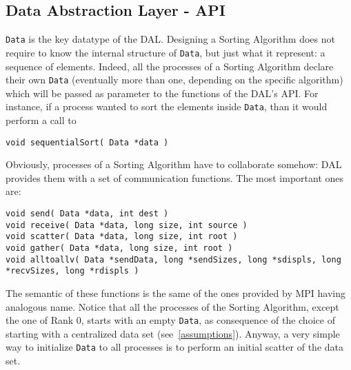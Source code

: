 \subsection*{Data Abstraction Layer - API}
\texttt{Data} is the key datatype of the DAL. Designing a Sorting Algorithm does not require to know the internal structure of \texttt{Data}, but just what it represent: a sequence of elements. Indeed, all the processes of a Sorting Algorithm declare their own \texttt{Data} (eventually more than one, depending on the specific algorithm) which will be passed as parameter to the functions of the DAL's API. For instance, if a process wanted to sort the elements inside \texttt{Data}, than it would perform a call to
\begin{lstlisting}
void sequentialSort( Data *data )
\end{lstlisting}
Obviously, processes of a Sorting Algorithm have to collaborate somehow: DAL provides them with a set of communication functions. The most important ones are:
\begin{lstlisting}
void send( Data *data, int dest )
void receive( Data *data, long size, int source )
void scatter( Data *data, long size, int root )
void gather( Data *data, long size, int root )
void alltoallv( Data *sendData, long *sendSizes, long *sdispls, long *recvSizes, long *rdispls )
\end{lstlisting}
The semantic of these functions is the same of the ones provided by MPI having analogous name. Notice that all the processes of the Sorting Algorithm, except the one of Rank $0$, starts with an empty \texttt{Data}, as consequence of the choice of starting with a centralized data set (see~\ref{assumptions}). Anyway, a very simple way to initialize \texttt{Data} to all processes is to perform an initial scatter of the data set.

